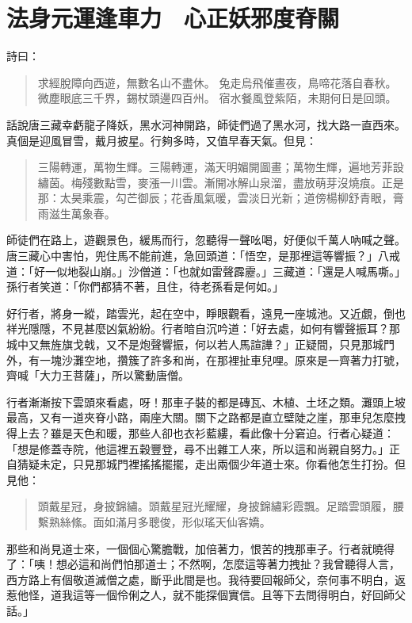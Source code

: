 
\chapter{法身元運逢車力　心正妖邪度脊關}

詩曰：
\begin{quote}
求經脫障向西遊，無數名山不盡休。
兔走烏飛催晝夜，鳥啼花落自春秋。
微塵眼底三千界，錫杖頭邊四百州。
宿水餐風登紫陌，未期何日是回頭。
\end{quote}

話說唐三藏幸虧龍子降妖，黑水河神開路，師徒們過了黑水河，找大路一直西來。真個是迎風冒雪，戴月披星。行夠多時，又值早春天氣。但見：
\begin{quote}
三陽轉運，萬物生輝。三陽轉運，滿天明媚開圖畫；萬物生輝，遍地芳菲設繡茵。梅殘數點雪，麥漲一川雲。漸開冰解山泉溜，盡放萌芽沒燒痕。正是那：太昊乘震，勾芒御辰；花香風氣暖，雲淡日光新；道傍楊柳舒青眼，膏雨滋生萬象春。
\end{quote}

師徒們在路上，遊觀景色，緩馬而行，忽聽得一聲吆喝，好便似千萬人吶喊之聲。唐三藏心中害怕，兜住馬不能前進，急回頭道：「悟空，是那裡這等響振？」八戒道：「好一似地裂山崩。」沙僧道：「也就如雷聲霹靂。」三藏道：「還是人喊馬嘶。」孫行者笑道：「你們都猜不著，且住，待老孫看是何如。」

好行者，將身一縱，踏雲光，起在空中，睜眼觀看，遠見一座城池。又近覷，倒也祥光隱隱，不見甚麼凶氣紛紛。行者暗自沉吟道：「好去處，如何有響聲振耳？那城中又無旌旗戈戟，又不是炮聲響振，何以若人馬諠譁？」正疑間，只見那城門外，有一塊沙灘空地，攢簇了許多和尚，在那裡扯車兒哩。原來是一齊著力打號，齊喊「大力王菩薩」，所以驚動唐僧。

行者漸漸按下雲頭來看處，呀！那車子裝的都是磚瓦、木植、土坯之類。灘頭上坡最高，又有一道夾脊小路，兩座大關。關下之路都是直立壁陡之崖，那車兒怎麼拽得上去？雖是天色和暖，那些人卻也衣衫藍縷，看此像十分窘迫。行者心疑道：「想是修蓋寺院，他這裡五穀豐登，尋不出雜工人來，所以這和尚親自努力。」正自猜疑未定，只見那城門裡搖搖擺擺，走出兩個少年道士來。你看他怎生打扮。但見他：
\begin{quote}
頭戴星冠，身披錦繡。頭戴星冠光耀耀，身披錦繡彩霞飄。足踏雲頭履，腰繫熟絲絛。面如滿月多聰俊，形似瑤天仙客嬌。
\end{quote}

那些和尚見道士來，一個個心驚膽戰，加倍著力，恨苦的拽那車子。行者就曉得了：「咦！想必這和尚們怕那道士；不然啊，怎麼這等著力拽扯？我曾聽得人言，西方路上有個敬道滅僧之處，斷乎此間是也。我待要回報師父，奈何事不明白，返惹他怪，道我這等一個伶俐之人，就不能探個實信。且等下去問得明白，好回師父話。」

